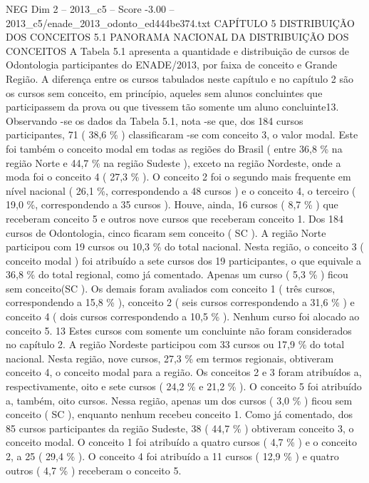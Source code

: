 \begin{textsample}{NEG Dim 2 – 2013\_c5 – Score -3.00 – 2013\_c5/enade\_2013\_odonto\_ed444be374.txt}  \label{ex:f2_neg_061}
CAPÍTULO 5 DISTRIBUIÇÃO DOS CONCEITOS 5.1 PANORAMA NACIONAL DA DISTRIBUIÇÃO DOS CONCEITOS A Tabela 5.1 apresenta a quantidade e distribuição de cursos de Odontologia participantes do ENADE/2013, por faixa de conceito e Grande Região.
A diferença entre os cursos tabulados neste capítulo e no capítulo 2 são os cursos sem conceito, em princípio, aqueles sem alunos concluintes que participassem da prova ou que tivessem tão somente um aluno concluinte13.
Observando -se os dados da Tabela 5.1, nota -se que, dos 184 cursos participantes, 71 ( 38,6 \% ) classificaram -se com conceito 3, o valor modal.
Este foi também o conceito modal em todas as regiões do Brasil ( entre 36,8 \% na região Norte e 44,7 \% na região Sudeste ), exceto na região Nordeste, onde a moda foi o conceito 4 ( 27,3 \% ).
O conceito 2 foi o segundo mais frequente em nível nacional ( 26,1 \%, correspondendo a 48 cursos ) e o conceito 4, o terceiro ( 19,0 \%, correspondendo a 35 cursos ).
Houve, ainda, 16 cursos ( 8,7 \% ) que receberam conceito 5 e outros nove cursos que receberam conceito 1.
Dos 184 cursos de Odontologia, cinco ficaram sem conceito ( SC ).
A região Norte participou com 19 cursos ou 10,3 \% do total nacional.
Nesta região, o conceito 3 ( conceito modal ) foi atribuído a sete cursos dos 19 participantes, o que equivale a 36,8 \% do total regional, como já comentado.
Apenas um curso ( 5,3 \% ) ficou sem conceito(SC ).
Os demais foram avaliados com conceito 1 ( três cursos, correspondendo a 15,8 \% ), conceito 2 ( seis cursos correspondendo a 31,6 \% ) e conceito 4 ( dois cursos correspondendo a 10,5 \% ).
Nenhum curso foi alocado ao conceito 5. 13 Estes cursos com somente um concluinte não foram considerados no capítulo 2.
A região Nordeste participou com 33 cursos ou 17,9 \% do total nacional.
Nesta região, nove cursos, 27,3 \% em termos regionais, obtiveram conceito 4, o conceito modal para a região.
Os conceitos 2 e 3 foram atribuídos a, respectivamente, oito e sete cursos ( 24,2 \% e 21,2 \% ).
O conceito 5 foi atribuído a, também, oito cursos.
Nessa região, apenas um dos cursos ( 3,0 \% ) ficou sem conceito ( SC ), enquanto nenhum recebeu conceito 1.
Como já comentado, dos 85 cursos participantes da região Sudeste, 38 ( 44,7 \% ) obtiveram conceito 3, o conceito modal.
O conceito 1 foi atribuído a quatro cursos ( 4,7 \% ) e o conceito 2, a 25 ( 29,4 \% ).
O conceito 4 foi atribuído a 11 cursos ( 12,9 \% ) e quatro outros ( 4,7 \% ) receberam o conceito 5.

\end{textsample}

